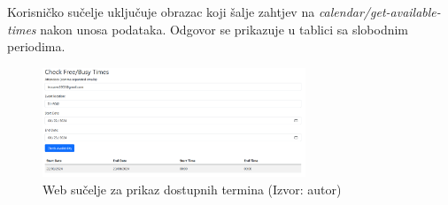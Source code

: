 \documentclass{foi}
\begin{document}
\newpage
Korisničko sučelje uključuje obrazac koji šalje zahtjev na \textit{calendar/get-available-times} nakon unosa podataka. Odgovor se prikazuje u tablici sa slobodnim periodima.

\begin{figure}[H]
    \centering
    \includegraphics[width=0.7\textwidth]{slike/timesAvaileble.png}
    \caption{Web sučelje za prikaz dostupnih termina (Izvor: autor)}
    \label{fig:UserInterfaceAvailible}
\end{figure}
\end{document}
